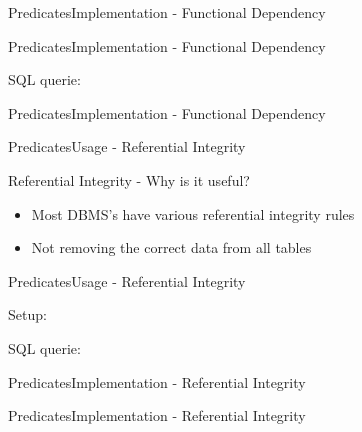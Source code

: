 \begin{frame}{Predicates}{Implementation - Functional Dependency}
\end{frame}

\begin{frame}{Predicates}{Implementation - Functional Dependency}
	\begin{block}{SQL querie:}
	\end{block}
\end{frame}

\begin{frame}{Predicates}{Implementation - Functional Dependency}
\end{frame}

\begin{frame}{Predicates}{Usage - Referential Integrity}
	\begin{block}{Referential Integrity - Why is it useful?}
		\begin{itemize}
			\item<1-> Most DBMS's have various referential integrity rules
			\item<2-> Not removing the correct data from all tables
		\end{itemize}
	\end{block}
\end{frame}

\begin{frame}{Predicates}{Usage - Referential Integrity}
  \begin{block}{Setup:}
	\end{block}
	\begin{block}{SQL querie:}
	\end{block}
\end{frame}

\begin{frame}{Predicates}{Implementation - Referential Integrity}
\end{frame}

\begin{frame}{Predicates}{Implementation - Referential Integrity}
\end{frame}

